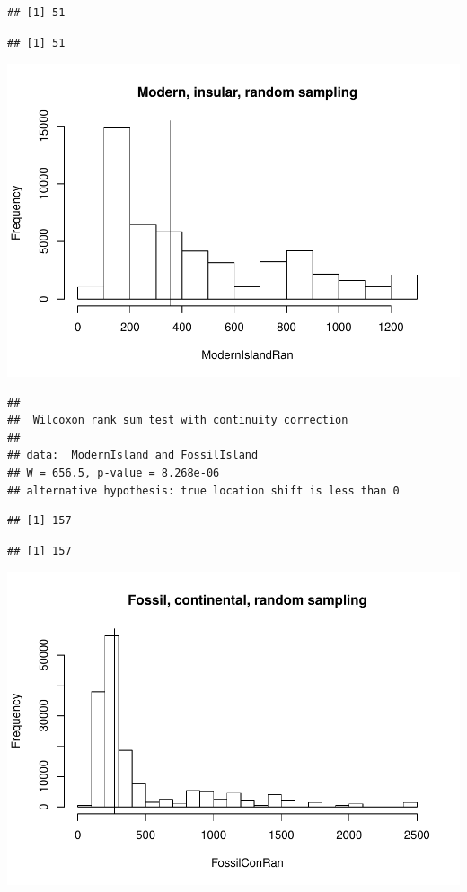 \documentclass[]{article}
\begin{document}
\begin{verbatim}
## [1] 51
\end{verbatim}

\begin{verbatim}
## [1] 51
\end{verbatim}

\includegraphics{MA_JJ_files/figure-latex/RSMFCI-1.pdf}

\begin{verbatim}
## 
##  Wilcoxon rank sum test with continuity correction
## 
## data:  ModernIsland and FossilIsland
## W = 656.5, p-value = 8.268e-06
## alternative hypothesis: true location shift is less than 0
\end{verbatim}

\begin{verbatim}
## [1] 157
\end{verbatim}

\begin{verbatim}
## [1] 157
\end{verbatim}

\includegraphics{MA_JJ_files/figure-latex/RSMFCI-2.pdf}
\end{document}
